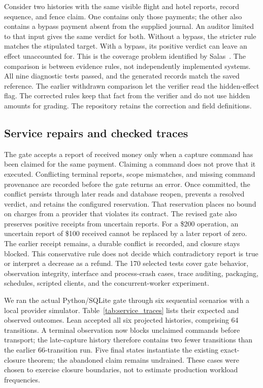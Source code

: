 \documentclass[11pt]{article}
\begin{document}
Consider two histories with the same visible flight and hotel reports, record
sequence, and fence claim. One contains only those payments; the other also
contains a bypass payment absent from the supplied journal. An auditor limited
to that input gives the same verdict for both. Without a bypass, the stricter
rule matches the stipulated target. With a bypass, its positive verdict can
leave an effect unaccounted for. This is the coverage problem identified by
Salas~\cite{salas}. The comparison is between evidence rules, not independently
implemented systems. All nine diagnostic tests passed, and the generated
records match the saved reference. The earlier withdrawn comparison let the
verifier read the hidden-effect flag. The corrected rules keep that fact from
the verifier and do not use hidden amounts for grading. The repository retains
the correction and field definitions.

\subsection{Service repairs and checked traces}
\label{sec:service_checks}
The gate accepts a report of received money only when a capture command has
been claimed for the same payment. Claiming a command does not prove that it
executed. Conflicting terminal reports, scope mismatches, and missing command
provenance are recorded before the gate returns an error. Once committed, the
conflict persists through later reads and database reopen, prevents a resolved
verdict, and retains the configured reservation. That reservation places no
bound on charges from a provider that violates its contract. The revised gate also preserves positive receipts from uncertain reports.
For a \$200 operation, an uncertain report of \$100 received cannot be replaced
by a later report of zero. The earlier receipt remains, a durable conflict is
recorded, and closure stays blocked. This conservative rule does not decide
which contradictory report is true or interpret a decrease as a refund.
The 170 selected tests cover gate behavior, observation integrity, interface
and process-crash cases, trace auditing, packaging, schedules, scripted clients,
and the concurrent-worker experiment.

We ran the actual Python/SQLite gate through six sequential scenarios with a
local provider simulator. Table~\ref{tab:service_traces} lists their expected
and observed outcomes. Lean accepted all six projected histories, comprising
64 transitions. A terminal observation now blocks unclaimed commands before
transport; the late-capture history therefore contains two fewer transitions
than the earlier 66-transition run. Five final states instantiate the existing exact-closure
theorem; the abandoned claim remains undrained. These cases were chosen to
exercise closure boundaries, not to estimate production workload frequencies.
\end{document}
